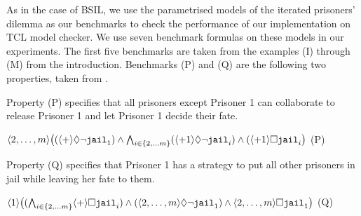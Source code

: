 As in the case of BSIL, we use the parametrised models of the iterated prisoners' dilemma 
as our benchmarks to check the performance of our implementation on TCL model checker.  
We use seven benchmark formulas on these models in our experiments.  
The first five benchmarks are taken from the examples (I) through (M) from the introduction.
Benchmarks (P) and (Q) are the following two properties, taken from \cite{WHY11}. 
\begin{list1} 
\item Property (P) specifies that all prisoners except Prisoner 1 can collaborate 
  to release Prisoner 1 and let Prisoner 1 decide their fate.

  $\langle 2,\ldots,m\rangle \big((\langle + \rangle \Diamond \neg \mbox{\tt jail}_1) \wedge
  \bigwedge_{i \in \{2,\ldots m\}} (\langle +1 \rangle \Diamond \neg \mbox{\tt jail}_i) \wedge
  (\langle +1 \rangle \Box \mbox{\tt jail}_i\big)$
  \hfill (P) 
\item Property (Q) specifies that Prisoner 1 has a strategy to put all other prisoners in jail while leaving her fate to them.

    $\langle 1\rangle \big( (\bigwedge_{i \in \{2,\ldots m\}} \langle + \rangle \Box \mbox{\tt jail}_i) \wedge
    (\langle 2,\ldots,m\rangle \Diamond \neg \mbox{\tt jail}_1) \wedge \langle 2,\ldots,m\rangle \Box \mbox{\tt jail}_1 \big)$
  \hfill (Q) 
\end{list1} 
